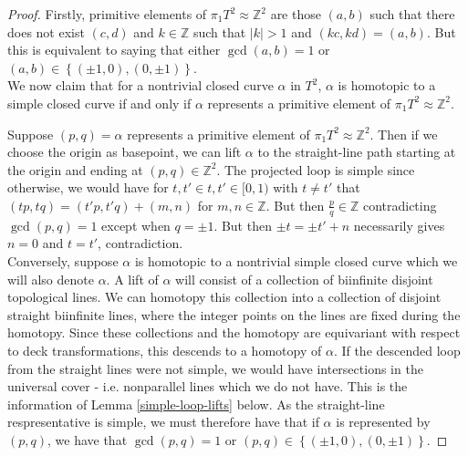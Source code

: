 \documentclass[reqno]{amsart}
\theoremstyle{definition}
\theoremstyle{remark}
\begin{document}
\begin{proof}
    Firstly, primitive elements
    of $\pi_1 T^2 \approx \mathbb{Z}^2$ are those
    $\left( a,b \right) $ such that there
    does not exist $(c,d)$ and $k \in \mathbb{Z}$ such that
    $\left| k \right| >1$ and $\left( kc,kd \right) =
    \left( a,b \right) $. But this is equivalent to saying that
    either $\gcd (a,b) = 1$ or $\left( a,b \right) 
    \in \left\{ \left( \pm 1,0 \right) ,
    \left( 0, \pm 1 \right) \right\} $.\\
    
    We now claim that for a nontrivial closed curve $\alpha$ in $T^2$,
    $\alpha$ is homotopic to a simple closed curve if and only
    if $\alpha$ represents a primitive element of
    $\pi_1 T^2 \approx \mathbb{Z}^2$.

    Suppose $ (p,q) = \alpha$ represents a primitive element of
    $\pi_1 T^2 \approx \mathbb{Z}^2$. Then if we choose
    the origin as basepoint, we can lift  $\alpha$ to
    the straight-line path starting at the origin and 
    ending at $\left( p,q \right)  \in \mathbb{Z}^2$. 
    The projected loop is simple since otherwise,
    we would have for $t,t' \in t,t' \in [0,1) $ with
    $t \neq t'$ that
    $\left( tp,tq \right) = \left( t'p,t'q \right) +
    \left( m,n \right) $ for $m,n \in \mathbb{Z}$.
    But then $\frac{p}{q} \in \mathbb{Z}$ contradicting
    $\gcd \left( p,q \right) = 1$ except when
    $q = \pm 1$. But then $\pm t = \pm t' + n$ necessarily
    gives $n = 0$ and $t = t'$, contradiction.\\
    \linebreak
    Conversely, suppose $\alpha$ is homotopic to
    a nontrivial simple closed curve which we will also
    denote $\alpha$. A lift of $\alpha$ will consist
    of a collection of biinfinite disjoint topological lines.
    We can homotopy this collection into a collection of disjoint
    straight biinfinite lines, where the integer points on
    the lines are fixed during the homotopy. 
    Since these collections and the homotopy are equivariant
    with respect to deck transformations, this descends
    to a homotopy of $\alpha$. If the descended loop
    from the straight lines were not simple, we would
    have intersections in the universal cover - i.e. nonparallel
    lines which we do not have. This is the information of
    Lemma \ref{simple-loop-lifts} below.
    As the straight-line respresentative is simple, we
    must therefore have that if $\alpha$ is represented by
    $\left( p,q \right) $, we have that
    $ \gcd \left( p,q \right) = 1$ or
    $\left( p,q \right) \in \left\{ \left( \pm 1,0 \right) ,
    \left( 0, \pm 1 \right) \right\} $.
\end{proof}
\end{document}
